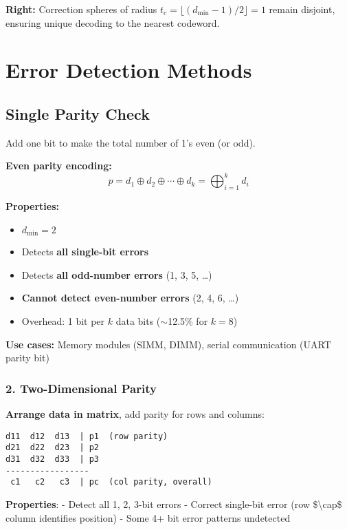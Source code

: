 \textbf{Right:} Correction spheres of radius $t_c = \lfloor(d_{\min} - 1)/2\rfloor = 1$ remain disjoint, ensuring unique decoding to the nearest codeword.

\section{Error Detection Methods}\label{error-detection-methods}

\subsection{Single Parity Check}

Add one bit to make the total number of 1's even (or odd).

\textbf{Even parity encoding:}
\begin{equation}
p = d_1 \oplus d_2 \oplus \cdots \oplus d_k = \bigoplus_{i=1}^{k} d_i
\label{eq:single-parity}
\end{equation}

\textbf{Properties:}
\begin{itemize}
\item $d_{\min} = 2$
\item Detects \textbf{all single-bit errors}
\item Detects \textbf{all odd-number errors} (1, 3, 5, \ldots)
\item \textbf{Cannot detect even-number errors} (2, 4, 6, \ldots)
\item Overhead: 1 bit per $k$ data bits ($\sim$12.5\% for $k=8$)
\end{itemize}

\textbf{Use cases:} Memory modules (SIMM, DIMM), serial communication (UART parity bit)

\subsubsection{2. Two-Dimensional Parity}\label{two-dimensional-parity}

\textbf{Arrange data in matrix}, add parity for rows and columns:

\begin{verbatim}
d11  d12  d13  | p1  (row parity)
d21  d22  d23  | p2
d31  d32  d33  | p3
-----------------
 c1   c2   c3  | pc  (col parity, overall)
\end{verbatim}

\textbf{Properties}: - Detect all 1, 2, 3-bit errors - Correct
single-bit error (row \$\textbackslash cap\$ column identifies position)
- Some 4+ bit error patterns undetected

